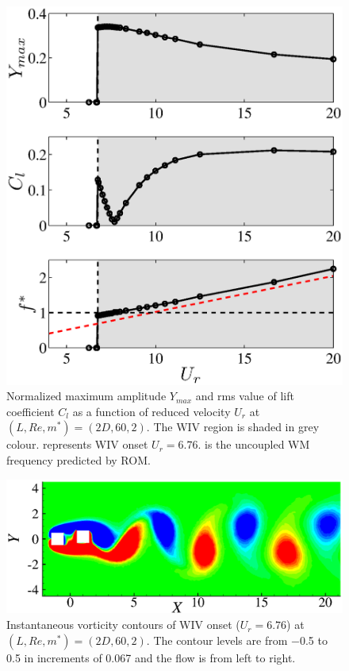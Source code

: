 \begin{figure}
	 \centering
	 \includegraphics[scale=0.45]{fom_square_m2}
     \caption{Normalized maximum amplitude $Y_{max}$ and 
        rms value of lift coefficient $C_l$
         as a function of reduced velocity $U_r$ at $(L,Re,m^*)=(2D,60,2)$. 
        The WIV region is shaded in grey colour.
        {\protect\blackdash} represents WIV onset $U_r=6.76$. {\protect\reddash} is the uncoupled WM frequency predicted by ROM. }
\label{fig:fom_2_ycl_square}
\end{figure}
\begin{figure}
	 \centering
	 \includegraphics[scale=0.45]{square_re60_m2_onset_vor}
     \caption{Instantaneous vorticity contours of WIV onset ($U_r=6.76$)
      at $(L,Re,m^*)=(2D,60,2)$.
      The contour levels are from −0.5 to 0.5 in increments of 0.067 and the flow is from left to
      right. }
\label{fig:fom_20_onset_vor}
\end{figure}


